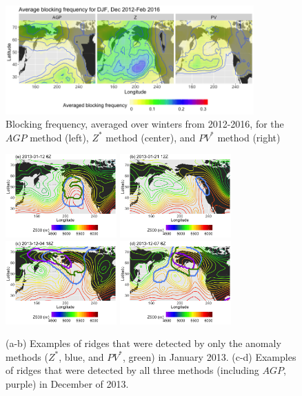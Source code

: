 \documentclass[smallextended]{svjour3}       %
\numberwithin{equation}{section}
\begin{document}
\begin{figure}
\centering
\includegraphics[width=0.85\textwidth]{fig5}
\caption{Blocking frequency, averaged over winters from 2012-2016, for the $AGP$ method (left), $Z^*$ method (center), and $PV^*$ method (right)}\label{RRRFreq}
\end{figure}

\begin{figure}
\centering
\includegraphics[width=0.38\textwidth]{fig6a}
\includegraphics[width=0.38\textwidth]{fig6b}\\
\includegraphics[width=0.38\textwidth]{fig6c}
\includegraphics[width=0.38\textwidth]{fig6d}
\caption{(a-b) Examples of ridges that were detected by only the anomaly methods ($Z^*$, blue, and $PV^*$, green) in January 2013. (c-d) Examples of ridges that were detected by all three methods (including $AGP$, purple) in December of 2013.}\label{RRRpanel}
\end{figure}
\end{document}
